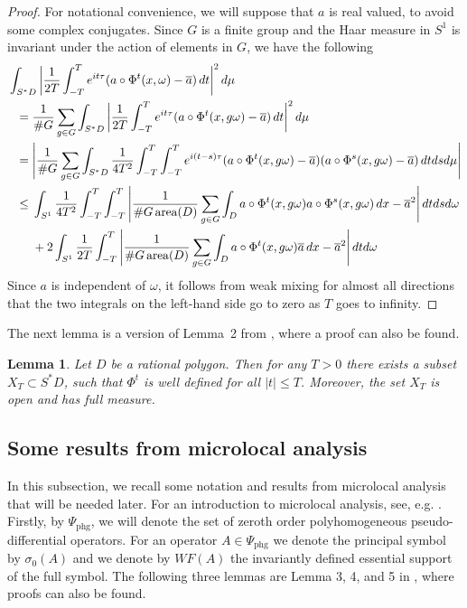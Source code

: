 \documentclass[10pt,a4paper]{amsart}
\newcommand{\1}{\mathrm{\mathbf{1}}}
\DeclareMathOperator{\area}{area}
\numberwithin{equation}{section}
\newtheorem{lemma}[thm]{Lemma}
\begin{document}
\begin{proof}
For notational convenience, we will suppose that $a$ is real valued, to avoid some complex conjugates. Since $G$ is a finite group and the Haar measure in $S^1$ is invariant under the action of elements in $G$, we have the following
\begin{equation*}
    \begin{aligned}
     \MoveEqLeft \int_{S^*D} \bigg| \frac{1}{2T} \int_{-T}^{T} e^{it\tau} (  a\circ\Phi^t(x,\omega) - \overline{a}) \, dt \bigg|^2 \, d\mu 
     \\
     ={}& \frac{1}{\# G} \sum_{g\in G}\int_{S^*D} \bigg| \frac{1}{2T} \int_{-T}^{T} e^{it\tau} (  a\circ\Phi^t(x,g\omega) - \overline{a}) \, dt \bigg|^2 \, d\mu
     \\
     ={}& \Bigg| \frac{1}{\# G} \sum_{g\in G}\int_{S^*D}  \frac{1}{4T^2} \int_{-T}^{T}\int_{-T}^{T} e^{i(t-s)\tau} (  a\circ\Phi^t(x,g\omega) - \overline{a})(  a\circ\Phi^s(x,g\omega) - \overline{a}) \, dt ds d\mu \Bigg|
     \\
     \leq{}& \int_{S^1} \frac{1}{4T^2} \int_{-T}^{T}\int_{-T}^{T} \Bigg| \frac{1}{\# G \area(D)}  \sum_{g\in G} \int_D a\circ\Phi^t(x,g\omega) a\circ\Phi^s(x,g\omega) \,dx  - \overline{a}^2 \Bigg| \, dtds d\omega
     \\
     &+2 \int_{S^1} \frac{1}{2T} \int_{-T}^{T}  \Bigg| \frac{1}{\# G \area(D)} \sum_{g\in G}\int_{D}  a\circ\Phi^t(x,g\omega) \overline{a} \, dx  - \overline{a}^2 \Bigg| \, dt d\omega 
     \end{aligned}
\end{equation*}
Since $a$ is independent of $\omega$, it follows from weak mixing for almost all directions that the two integrals on the left-hand side go to zero as $T$ goes to infinity. 
\end{proof}

The next lemma is a version of Lemma~{2} from \cite{ZZ96}, where a proof can also be found. 

\begin{lemma}\label{LE:Set_for_flow}
    Let $D$ be a rational polygon. Then for any $T>0$ there exists a subset $X_T \subset S^{*}D$, such that $\Phi^t$ is well defined for all $|t|\leq T$. Moreover, the set $X_T$ is open and has full measure.
\end{lemma}

\subsection{Some results from microlocal analysis}
In this subsection, we recall some notation and results from microlocal analysis that will be needed later. For an introduction to microlocal analysis, see, e.g. \cite{MR0618463,MR2304165}. Firstly, by $\Psi_{\mathrm{phg}}$, we will denote the set of zeroth order polyhomogeneous pseudo-differential operators. For an operator $A\in \Psi_{\mathrm{phg}}$ we denote the principal symbol by $\sigma_0(A)$ and we denote by $WF(A)$ the invariantly defined essential support of the full symbol. 
The following three lemmas are Lemma {3}, {4}, and {5} in \cite{ZZ96}, where proofs can also be found.
\end{document}
